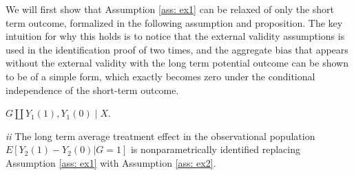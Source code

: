 \documentclass[uplatex,dvipdfmx]{jsarticle}
\begin{document}
We will first show that Assumption \ref{ass: ex1} can be relaxed  of only the short term outcome, formalized in the following assumption and proposition. The key intuition for why this holds is to notice that the external validity assumptions is used in the identification proof of \cite{athey2020combining} two times, and the aggregate bias that appears without the external validity with the long term potential outcome can be shown to be of a simple form, which exactly becomes zero under the conditional independence of the short-term outcome.
\begin{assumption}\label{ass: ex2}
    $G \amalg Y_1(1) ,Y_1(0) \mid X$.
\end{assumption}
\begin{proposition}
\textit{ii} The long term average treatment effect in the observational population $ E[Y_2(1) -Y_2(0) | G=1]$ is nonparametrically identified replacing Assumption \ref{ass: ex1} with Assumption \ref{ass: ex2}.
\end{proposition}
\end{document}
